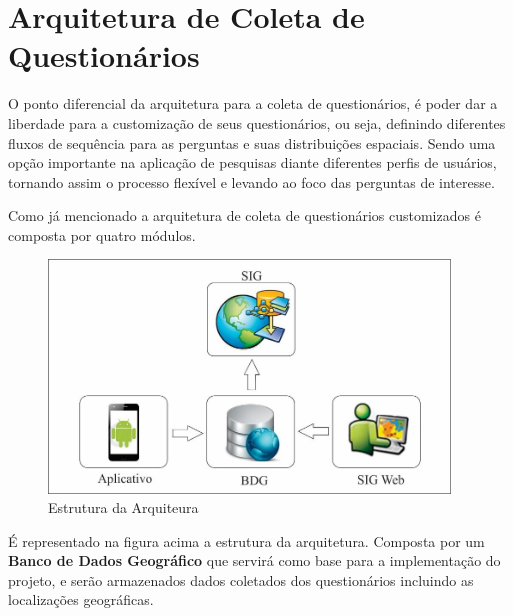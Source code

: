 \documentclass[
	12pt,				%
    oneside,			%
	a4paper,			%
	english,			%
	french,				%
	spanish,			%
	brazil,				%
	]{abntex2}
\begin{document}
\section{Arquitetura de Coleta de Questionários}

O ponto diferencial da arquitetura para a coleta de questionários, é poder dar a liberdade para a customização de seus questionários, ou seja, definindo diferentes fluxos de sequência para as perguntas e suas distribuições espaciais. Sendo uma opção importante na aplicação de pesquisas diante diferentes perfis de usuários, tornando assim o processo flexível e levando ao foco das perguntas de interesse.


Como já mencionado a arquitetura de coleta de questionários customizados é composta por quatro módulos.

\begin{figure} [H] 
\label{figura1} 
\caption{Estrutura da Arquiteura}
\includegraphics[width=0.95\textwidth]{arquituraproposta.jpg} %
\end{figure}

É representado na figura acima a estrutura da arquitetura. Composta por um \textbf{Banco de Dados Geográfico} que servirá como base para a implementação do projeto, e serão armazenados dados coletados dos questionários incluindo as localizações geográficas.
\end{document}
